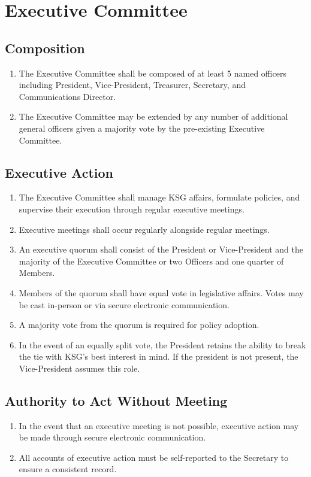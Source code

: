 \documentclass[12pt,executivepaper]{article}
\begin{document}
\section{Executive Committee}

\subsection{Composition}
\begin{enumerate}
    \item The Executive Committee shall be composed of at least 5 named officers including
          President, Vice-President, Treasurer, Secretary, and Communications Director. 
    \item The Executive Committee may be extended by any number of additional general officers
          given a majority vote by the pre-existing Executive Committee.
\end{enumerate}

\subsection{Executive Action}
\begin{enumerate}
    \item The Executive Committee shall manage KSG affairs, formulate policies, and supervise
          their execution through regular executive meetings.
    \item Executive meetings shall occur regularly alongside regular meetings.
    \item An executive quorum shall consist of the President or Vice-President and the
          majority of the Executive Committee or two Officers and one quarter of Members.
    \item Members of the quorum shall have equal vote in legislative affairs.
          Votes may be cast in-person or via secure electronic communication.
    \item A majority vote from the quorum is required for policy adoption.
    \item In the event of an equally split vote, the President retains the ability to
          break the tie with KSG's best interest in mind. If the president is not present,
          the Vice-President assumes this role.
\end{enumerate}

\subsection{Authority to Act Without Meeting}
\begin{enumerate}
    \item In the event that an executive meeting is not possible, executive action
          may be made through secure electronic communication.
    \item All accounts of executive action must be self-reported to the
          Secretary to ensure a consistent record.
\end{enumerate}
\end{document}
